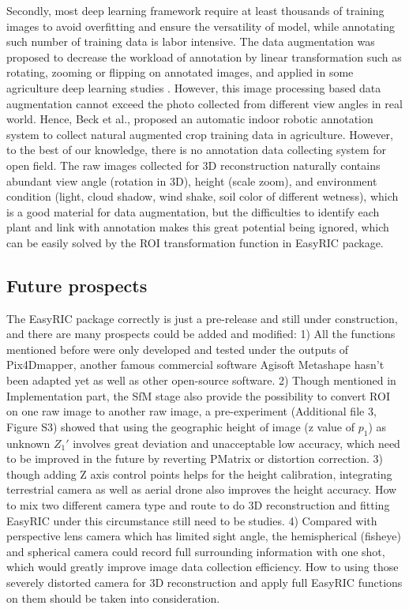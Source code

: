 \documentclass{configs/bmcart}
\begin{document}
Secondly, most deep learning framework require at least thousands of training images to avoid overfitting and ensure the versatility of model, while annotating such number of training data is labor intensive. The data augmentation was proposed to decrease the workload of annotation by linear transformation such as rotating, zooming or flipping on annotated images, and applied in some agriculture deep learning studies \cite{han_real-time_2020, zhou_fast_2020}. However, this image processing based data augmentation cannot exceed the photo collected from different view angles in real world. Hence, Beck et al.,\cite{beck_embedded_2020} proposed an automatic indoor robotic annotation system to collect natural augmented crop training data in agriculture. However, to the best of our knowledge, there is no annotation data collecting system for open field. The raw images collected for 3D reconstruction naturally contains abundant view angle (rotation in 3D), height (scale zoom), and environment condition (light, cloud shadow, wind shake, soil color of different wetness), which is a good material for data augmentation, but the difficulties to identify each plant and link with annotation makes this great potential being ignored, which can be easily solved by the ROI transformation function in EasyRIC package.

\subsection*{Future prospects}
The EasyRIC package correctly is just a pre-release and still under construction, and there are many prospects could be added and modified: 1) All the functions mentioned before were only developed and tested under the outputs of Pix4Dmapper, another famous commercial software Agisoft Metashape hasn't been adapted yet as well as other open-source software. 2) Though mentioned in Implementation part, the SfM stage also provide the possibility to convert ROI on one raw image to another raw image, a pre-experiment (Additional file 3, Figure S3) showed that using the geographic height of image (z value of $p_1$) as unknown $Z_1'$ involves great deviation and unacceptable low accuracy, which need to be improved in the future by reverting PMatrix or distortion correction. 3) though adding Z axis control points helps for the height calibration, integrating terrestrial camera as well as aerial drone also improves the height accuracy. How to mix two different camera type and route to do 3D reconstruction and fitting EasyRIC under this circumstance still need to be studies. 4) Compared with perspective lens camera which has limited sight angle, the hemispherical (fisheye) and spherical camera could record full surrounding information with one shot, which would greatly improve image data collection efficiency. How to using those severely distorted camera for 3D reconstruction and apply full EasyRIC functions on them should be taken into consideration.
\end{document}
